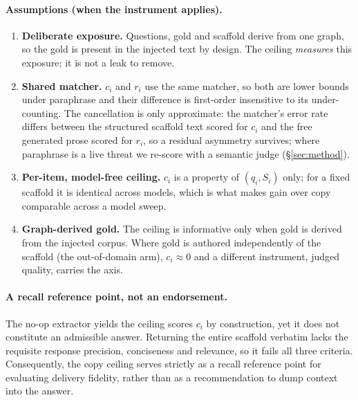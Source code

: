 \documentclass[10pt,twocolumn]{article}
\begin{document}
\paragraph{Assumptions (when the instrument applies).}
\begin{enumerate}[label=(A\arabic*),topsep=2pt,itemsep=1pt,leftmargin=2.4em]
\item \textbf{Deliberate exposure.} Questions, gold and scaffold derive from one graph, so the gold
is present in the injected text by design. The ceiling \emph{measures} this exposure; it is not a
leak to remove.
\item \textbf{Shared matcher.} $c_i$ and $r_i$ use the same matcher, so both are lower bounds under
paraphrase and their difference is first-order insensitive to its under-counting. The cancellation is
only approximate: the matcher's error rate differs between the structured scaffold text scored for
$c_i$ and the free generated prose scored for $r_i$, so a residual asymmetry survives; where paraphrase
is a live threat we re-score with a semantic judge (\S\ref{sec:method}).
\item \textbf{Per-item, model-free ceiling.} $c_i$ is a property of $(q_i,S_i)$ only; for a fixed
scaffold it is identical across models, which is what makes gain over copy comparable across a model
sweep.
\item \textbf{Graph-derived gold.} The ceiling is informative only when gold is derived from the
injected corpus. Where gold is authored independently of the scaffold (the out-of-domain arm),
$c_i\approx0$ and a different instrument, judged quality, carries the axis.
\end{enumerate}

\paragraph{A recall reference point, not an endorsement.} The no-op extractor yields the ceiling scores $c_i$ by construction, yet it does not constitute an admissible answer. Returning the entire scaffold verbatim lacks the requisite response precision, conciseness and relevance, so it fails all three criteria. Consequently, the copy ceiling serves strictly as a recall reference point for evaluating delivery fidelity, rather than as a recommendation to dump context into the answer.
\end{document}
